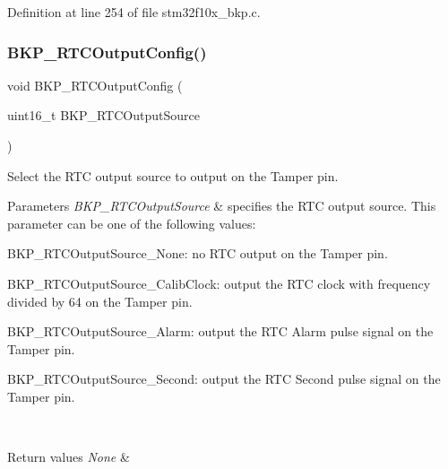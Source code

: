 Definition at line 254 of file stm32f10x\+\_\+bkp.\+c.

\mbox{\label{group___b_k_p___exported___functions_ga3d1b22b3c6a79f7b423616a0af1885bf}} 
\subsubsection{\texorpdfstring{B\+K\+P\+\_\+\+R\+T\+C\+Output\+Config()}{BKP\_RTCOutputConfig()}}
{\footnotesize\ttfamily void B\+K\+P\+\_\+\+R\+T\+C\+Output\+Config (\begin{DoxyParamCaption}\item[{uint16\+\_\+t}]{B\+K\+P\+\_\+\+R\+T\+C\+Output\+Source }\end{DoxyParamCaption})}



Select the R\+TC output source to output on the Tamper pin. 


\begin{DoxyParams}{Parameters}
{\em B\+K\+P\+\_\+\+R\+T\+C\+Output\+Source} & specifies the R\+TC output source. This parameter can be one of the following values\+: \begin{DoxyItemize}
\item B\+K\+P\+\_\+\+R\+T\+C\+Output\+Source\+\_\+\+None\+: no R\+TC output on the Tamper pin. \item B\+K\+P\+\_\+\+R\+T\+C\+Output\+Source\+\_\+\+Calib\+Clock\+: output the R\+TC clock with frequency divided by 64 on the Tamper pin. \item B\+K\+P\+\_\+\+R\+T\+C\+Output\+Source\+\_\+\+Alarm\+: output the R\+TC Alarm pulse signal on the Tamper pin. \item B\+K\+P\+\_\+\+R\+T\+C\+Output\+Source\+\_\+\+Second\+: output the R\+TC Second pulse signal on the Tamper pin. \end{DoxyItemize}
\\
\hline
\end{DoxyParams}

\begin{DoxyRetVals}{Return values}
{\em None} & \\
\hline
\end{DoxyRetVals}


